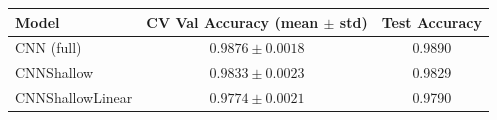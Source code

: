 \begin{tabular}{lcc}
\toprule
Model & CV Val Accuracy (mean $\pm$ std) & Test Accuracy \\
\midrule
  CNN (full) & $0.9876 \pm 0.0018$ & 0.9890 \\
  CNNShallow & $0.9833 \pm 0.0023$ & 0.9829 \\
  CNNShallowLinear & $0.9774 \pm 0.0021$ & 0.9790 \\
\bottomrule
\end{tabular}